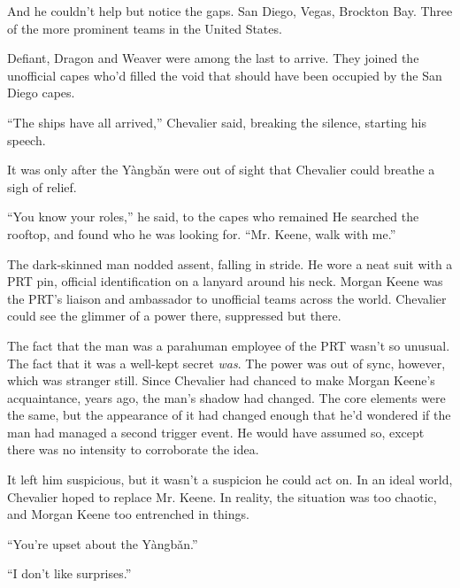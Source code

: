 And he couldn't help but notice the gaps.  San Diego, Vegas, Brockton Bay.  Three of the more prominent teams in the United States.



Defiant, Dragon and Weaver were among the last to arrive.  They joined the unofficial capes who'd filled the void that should have been occupied by the San Diego capes.



``The ships have all arrived,'' Chevalier said, breaking the silence, starting his speech.



\sectionbreak



It was only after the Y\`{a}ngb\v{a}n were out of sight that Chevalier could breathe a sigh of relief.



``You know your roles,'' he said, to the capes who remained  He searched the rooftop, and found who he was looking for.  ``Mr. Keene, walk with me.''



The dark-skinned man nodded assent, falling in stride.  He wore a neat suit with a PRT pin, official identification on a lanyard around his neck.  Morgan Keene was the PRT's liaison and ambassador to unofficial teams across the world.  Chevalier could see the glimmer of a power there, suppressed but there.



The fact that the man was a parahuman employee of the PRT wasn't so unusual.  The fact that it was a well-kept secret \emph{was}.  The power was out of sync, however, which was stranger still.  Since Chevalier had chanced to make Morgan Keene's acquaintance, years ago, the man's shadow had changed.  The core elements were the same, but the appearance of it had changed enough that he'd wondered if the man had managed a second trigger event.  He would have assumed so, except there was no intensity to corroborate the idea.



It left him suspicious, but it wasn't a suspicion he could act on.  In an ideal world, Chevalier hoped to replace Mr. Keene.  In reality, the situation was too chaotic, and Morgan Keene too entrenched in things.



``You're upset about the Y\`{a}ngb\v{a}n.''



``I don't like surprises.''



